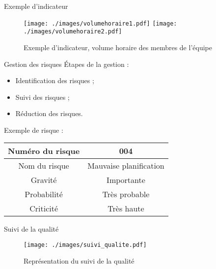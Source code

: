 	\begin{frame}{Exemple d'indicateur}
\begin{figure}
\centering
\texttt{[image: ./images/volumehoraire1.pdf]}
\texttt{[image: ./images/volumehoraire2.pdf]}
\caption{Exemple d'indicateur, volume horaire des membres de l'équipe}
\end{figure}

	\end{frame}	
	
	\begin{frame}{Gestion des risques}
	\'Etapes de la gestion :
	\begin{itemize}

		 \item Identification des risques ;
		 \item Suivi des risques ;
		 \item Réduction des risques.
		\end{itemize}
	\pause
	Exemple de risque :\\
		\begin{center}
	\begin{tabular}{|c|c|}
	\hline
	Numéro du risque & 004 \\ \hline
	Nom du risque & Mauvaise planification \\ \hline
	Gravité & Importante \\ \hline
	Probabilité & Très probable \\ \hline
	Criticité & Très haute \\ \hline
	\end{tabular}
	\end{center}
	
	\end{frame}	
	
	\begin{frame}{Suivi de la qualité}
\begin{figure}
	\centering
	\texttt{[image: ./images/suivi\_qualite.pdf]}
	\caption{Représentation du suivi de la qualité}
	\end{figure}
	
	\end{frame}
	

